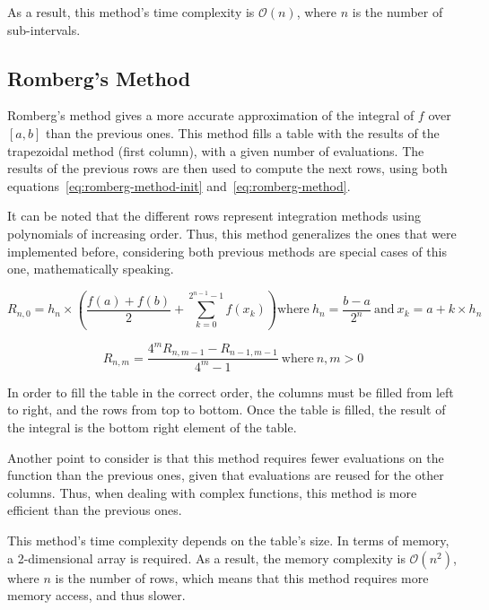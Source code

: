 As a result, this method's time complexity is $\mathcal{O}(n)$, where $n$ is the number of sub-intervals.


\subsection{Romberg's Method}

Romberg's method gives a more accurate approximation of the integral of $f$ over $[a, b]$ than the previous ones.
This method fills a table with the results of the trapezoidal method (first column), with a given number of evaluations.
The results of the previous rows are then used to compute the next rows, 
using both equations~\ref{eq:romberg-method-init} and~\ref{eq:romberg-method}.

It can be noted that the different rows represent integration methods using polynomials of increasing order.
Thus, this method generalizes the ones that were implemented before, considering both previous methods are special cases of this one, mathematically speaking.

\begin{equation}
	\label{eq:romberg-method-init}
	R_{n, 0} = h_n \times \left(\frac{f(a) + f(b)}{2} + \sum_{k = 0}^{2^{n - 1} - 1} f(x_k)\right)
	\text{where}\ h_n = \frac{b - a}{2^n}\ \text{and}\ x_k = a + k \times h_n
\end{equation}

\begin{equation}
	\label{eq:romberg-method}
	R_{n, m} = \frac{4^m R_{n, m - 1} - R_{n - 1, m - 1}}{4^m - 1}\ \text{where}\ n, m > 0
\end{equation}

In order to fill the table in the correct order, the columns must be filled from left to right, and the rows from top to bottom.
Once the table is filled, the result of the integral is the bottom right element of the table.

Another point to consider is that this method requires fewer evaluations on the function than the previous ones, given that evaluations are reused for the other columns.
Thus, when dealing with complex functions, this method is more efficient than the previous ones.

This method's time complexity depends on the table's size. In terms of memory, a 2-dimensional array is required. As a result, the memory complexity is $\mathcal{O}(n^2)$, where $n$ is the number of rows,
which means that this method requires more memory access, and thus slower.


